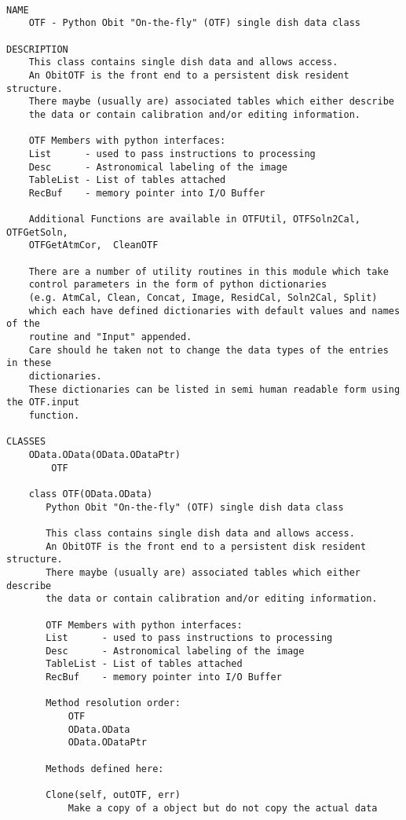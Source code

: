 \documentclass[11pt]{report}
\begin{document}
\begin{verbatim}

NAME
    OTF - Python Obit "On-the-fly" (OTF) single dish data class

DESCRIPTION
    This class contains single dish data and allows access.
    An ObitOTF is the front end to a persistent disk resident structure.
    There maybe (usually are) associated tables which either describe
    the data or contain calibration and/or editing information.
    
    OTF Members with python interfaces:
    List      - used to pass instructions to processing
    Desc      - Astronomical labeling of the image 
    TableList - List of tables attached
    RecBuf    - memory pointer into I/O Buffer
    
    Additional Functions are available in OTFUtil, OTFSoln2Cal, OTFGetSoln,
    OTFGetAtmCor,  CleanOTF
    
    There are a number of utility routines in this module which take
    control parameters in the form of python dictionaries
    (e.g. AtmCal, Clean, Concat, Image, ResidCal, Soln2Cal, Split)
    which each have defined dictionaries with default values and names of the
    routine and "Input" appended.
    Care should he taken not to change the data types of the entries in these
    dictionaries.
    These dictionaries can be listed in semi human readable form using the OTF.input
    function.

CLASSES
    OData.OData(OData.ODataPtr)
        OTF
    
    class OTF(OData.OData)
       Python Obit "On-the-fly" (OTF) single dish data class
       
       This class contains single dish data and allows access.
       An ObitOTF is the front end to a persistent disk resident structure.
       There maybe (usually are) associated tables which either describe
       the data or contain calibration and/or editing information.
       
       OTF Members with python interfaces:
       List      - used to pass instructions to processing
       Desc      - Astronomical labeling of the image 
       TableList - List of tables attached
       RecBuf    - memory pointer into I/O Buffer
       
       Method resolution order:
           OTF
           OData.OData
           OData.ODataPtr
       
       Methods defined here:
       
       Clone(self, outOTF, err)
           Make a copy of a object but do not copy the actual data
           

\end{verbatim}
\end{document}
